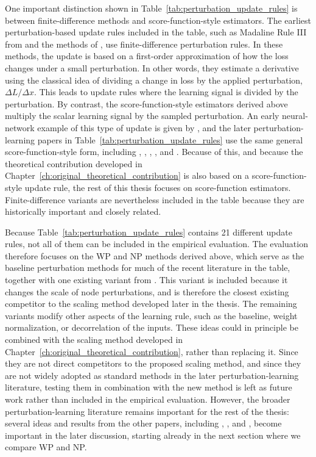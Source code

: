 One important distinction shown in Table~\ref{tab:perturbation_update_rules} is between finite-difference methods and score-function-style estimators. The earliest perturbation-based update rules included in the table, such as Madaline Rule III from \textcite{widrow_30_1990} and the methods of \textcite{flower_summed_1992}, use finite-difference perturbation rules. In these methods, the update is based on a first-order approximation of how the loss changes under a small perturbation. In other words, they estimate a derivative using the classical idea of dividing a change in loss by the applied perturbation, \(\Delta L / \Delta x\). This leads to update rules where the learning signal is divided by the perturbation. By contrast, the score-function-style estimators derived above multiply the scalar learning signal by the sampled perturbation. An early neural-network example of this type of update is given by \textcite{cauwenberghs_fast_1992}, and the later perturbation-learning papers in Table~\ref{tab:perturbation_update_rules} use the same general score-function-style form, including \textcite{werfel_learning_2003}, \textcite{cho_node_2011}, \textcite{hara_statistical_2017}, \textcite{hiratani_stability_2022}, and \textcite{zuge_weight_2023}. Because of this, and because the theoretical contribution developed in Chapter~\ref{ch:original_theoretical_contribution} is also based on a score-function-style update rule, the rest of this thesis focuses on score-function estimators. Finite-difference variants are nevertheless included in the table because they are historically important and closely related.

Because Table~\ref{tab:perturbation_update_rules} contains 21 different update rules, not all of them can be included in the empirical evaluation. The evaluation therefore focuses on the WP and NP methods derived above, which serve as the baseline perturbation methods for much of the recent literature in the table, together with one existing variant from \textcite{werfel_learning_2003}. This variant is included because it changes the scale of node perturbations, and is therefore the closest existing competitor to the scaling method developed later in the thesis. The remaining variants modify other aspects of the learning rule, such as the baseline, weight normalization, or decorrelation of the inputs. These ideas could in principle be combined with the scaling method developed in Chapter~\ref{ch:original_theoretical_contribution}, rather than replacing it. Since they are not direct competitors to the proposed scaling method, and since they are not widely adopted as standard methods in the later perturbation-learning literature, testing them in combination with the new method is left as future work rather than included in the empirical evaluation. However, the broader perturbation-learning literature remains important for the rest of the thesis: several ideas and results from the other papers, including \textcite{zuge_weight_2023}, \textcite{werfel_learning_2003}, and \textcite{hiratani_stability_2022}, become important in the later discussion, starting already in the next section where we compare WP and NP.

